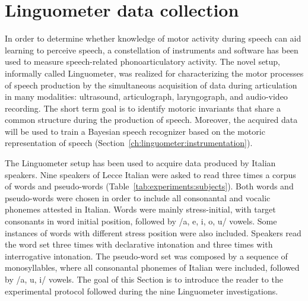 \section{Linguometer data collection}
\label{ch:experiments}
In order to determine whether knowledge of motor activity during speech
can aid learning to perceive speech, a constellation of instruments and
software has been used to measure speech-related phonoarticulatory activity.
The novel setup, informally called Linguometer, was realized for characterizing 
the motor processes of speech production by the simultaneous acquisition of data
during articulation in many modalities: ultrasound, articulograph,
laryngograph, and audio-video recording. 
The short term goal is to identify motoric invariants that share a common 
structure during the production of speech.
Moreover, the acquired data will be used to train a Bayesian speech recognizer
based on the motoric representation of speech (Section~\ref{ch:linguometer:instrumentation}).


The Linguometer setup has been used to acquire data produced by Italian
speakers. 
Nine speakers of Lecce Italian were asked to read three times a corpus of words
and pseudo-words (Table~\ref{tab:experiments:subjects}).
Both words and pseudo-words were chosen in order to include all consonantal and
vocalic phonemes attested in Italian. 
Words were mainly stress-initial, with target consonants in word initial 
position, followed by /a, e, i, o, u/ vowels. 
Some instances of words with different stress position were also included.
Speakers read the word set three times with declarative intonation and three 
times with interrogative intonation. 
The pseudo-word set was composed by a sequence of monosyllables, where all 
consonantal phonemes of Italian were included, followed by /a, u, i/ vowels. 
The goal of this Section is to introduce the reader to the experimental protocol
followed during the nine Linguometer investigations.
